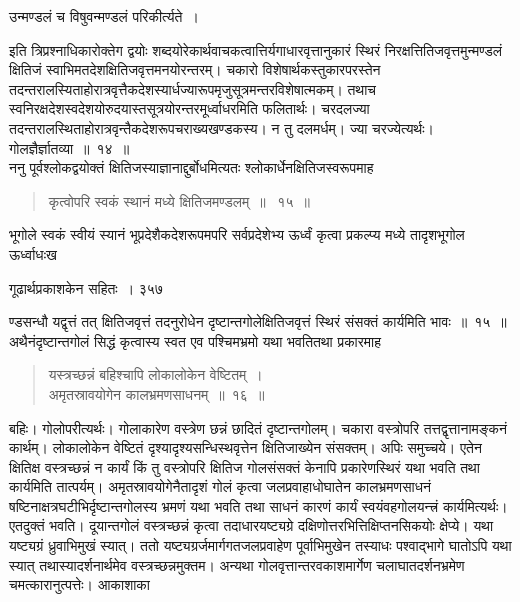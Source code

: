 \documentclass[11pt, openany]{book}
\begin{document}
\begin{center}
{\qt उन्मण्डलं च विषुवन्मण्डलं परिकीर्त्यते~।} 
\end{center}

 इति त्रिप्रश्नाधिकारोक्तेग द्वयोः शब्दयोरेकार्थवाचकत्वात्तिर्यगाधारवृत्तानुकारं स्थिरं निरक्षत्तितिजवृत्तमुन्मण्डलं क्षितिजं स्वाभिमतदेशक्षितिजवृत्तमनयोरन्तरम्। चकारो विशेषार्थकस्तुकारपरस्तेन तदन्तरालस्यिताहोरात्रवृत्तैकदेशस्यार्धज्यारूपमृजुसूत्रमन्तरविशेषात्मकम्। तथाच स्वनिरक्षदेशस्वदेशयोरुदयास्तसूत्रयोरन्तरमूर्ध्वाधरमिति फलितार्थः। चरदलज्या तदन्तरालस्थिताहोरात्रवृन्तैकदेशरूपचराख्यखण्डकस्य। न तु दलमर्धम्। ज्या चरज्येत्यर्थः। गोलज्ञैर्ज्ञातव्या~॥~१४~॥\\
\noindent ननु पूर्वश्लोकद्वयोक्तं क्षितिजस्याज्ञानाद्दुर्बोधमित्यतः श्लोकार्धेनक्षितिजस्वरूपमाह \textendash


  \begin{quote}
{\ssi कृत्वोपरि स्वकं स्थानं मध्ये क्षितिजमण्डलम्~॥~ १५~॥ }
\end{quote}
 भूगोले स्वकं स्वीयं स्यानं भूप्रदेशैकदेशरूपमपरि सर्वप्रदेशेभ्य ऊर्ध्वं कृत्वा प्रकल्प्य मध्ये तादृशभूगोल ऊर्ध्वाधःख \textendash



\newpage


\hspace{3cm} गूढार्थप्रकाशकेन सहितः~। \hfill ३५७
\vspace{1cm}


\noindent ण्डसन्धौ यद्वृत्तं तत् क्षितिजवृत्तं तदनुरोधेन दृष्टान्तगोलेक्षितिजवृत्तं स्थिरं संसक्तं कार्यमिति भावः~॥~१५~॥\\
\noindent अथैनंदृष्टान्तगोलं सिद्धं कृत्वास्य स्वत एव पश्चिमभ्रमो यथा भवतितथा प्रकारमाह \textendash


 \begin{quote}
{\ssi यस्त्रच्छन्नं बहिश्चापि लोकालोकेन वेष्टितम्~।\\
अमृतस्रावयोगेन कालभ्रमणसाधनम्~॥~१६~॥}
\end{quote}
 बहिः। गोलोपरीत्यर्थः। गोलाकारेण वस्त्रेण छन्नं छादितं दृष्टान्तगोलम्। चकारा वस्त्रोपरि तत्तद्वृत्तानामङ्कनं कार्थम्। लोकालोकेन वेष्टितं दृश्यादृश्यसन्धिस्थवृत्तेन क्षितिजाख्येन संसक्तम्। अपिः समुच्चये। एतेन क्षितिक्ष वस्त्रच्छन्नं न कार्यं किं तु वस्त्रोपरि क्षितिज गोलसंसक्तं केनापि प्रकारेणस्थिरं यथा भवति तथा कार्यमिति तात्पर्यम्। अमृतस्रावयोगेनैतादृशं गोलं कृत्वा जलप्रवाहाधोघातेन कालभ्रमणसाधनं षष्टिनाक्षत्रघटीभिर्दृष्टान्तगोलस्य भ्रमणं यथा भवति तथा साधनं कारणं कार्यं स्वयंवहगोलयन्त्त्रं कार्यमित्यर्थः।एतदुक्तं भवति। दूयान्तगोलं वस्त्रच्छन्नं कृत्वा तदाधारयष्ट्यग्रे दक्षिणोत्तरभित्तिक्षिप्तनसिकयोः क्षेप्ये। यथा यष्ट्यग्रं ध्रुवाभिमुखं स्यात्। ततो यष्ट्यग्रर्जमार्गगतजलप्रवाहेण पूर्वाभिमुखेन तस्याधः पश्वाद्भागे घातोऽपि यथा स्यात् तथास्यादर्शनार्थमेव वस्त्रच्छन्नमुक्तम। अन्यथा गोलवृत्तान्तरवकाशमार्गेण चलाघातदर्शनभ्रमेण चमत्कारानुत्पत्तेः। आकाशाका \textendash
\end{document}
